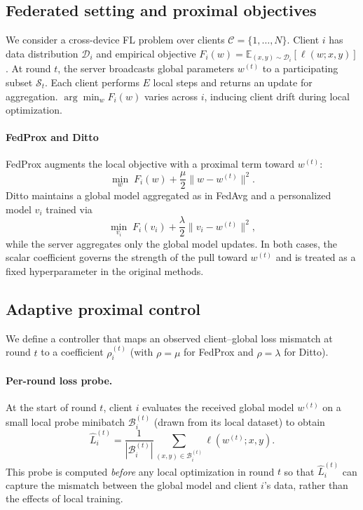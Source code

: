 \documentclass[letterpaper]{article} %
\begin{document}
\subsection{Federated setting and proximal objectives}

We consider a cross-device FL problem over clients $\mathcal{C}=\{1,\dots,N\}$. Client $i$ has data distribution $\mathcal{D}_i$ and empirical objective
$F_i(w)=\mathbb{E}_{(x,y)\sim\mathcal{D}_i}[\ell(w;x,y)]$.
At round $t$, the server broadcasts global parameters $w^{(t)}$ to a participating subset $\mathcal{S}_t$.
Each client performs $E$ local steps and returns an update for aggregation. $\arg\min_w F_i(w)$ varies across $i$, inducing client drift during local optimization.

\paragraph{FedProx and Ditto}
FedProx augments the local objective with a proximal term toward $w^{(t)}$:
\begin{equation}
\label{eq:fedprox_obj}
\min_{w}\; F_i(w) + \frac{\mu}{2}\|w-w^{(t)}\|^2.
\end{equation}
Ditto maintains a global model aggregated as in FedAvg and a personalized model $v_i$ trained via
\begin{equation}
\label{eq:ditto_obj}
\min_{v_i}\; F_i(v_i) + \frac{\lambda}{2}\|v_i-w^{(t)}\|^2,
\end{equation}
while the server aggregates only the global model updates. In both cases, the scalar coefficient governs the strength of the pull toward $w^{(t)}$ and is treated as a fixed hyperparameter in the original methods.

\subsection{Adaptive proximal control}

We define a controller that maps an observed client--global loss mismatch at round $t$ to a coefficient $\rho_i^{(t)}$ (with $\rho=\mu$ for FedProx and $\rho=\lambda$ for Ditto).

\paragraph{Per-round loss probe.}
At the start of round $t$, client $i$ evaluates the received global model $w^{(t)}$ on a small local probe minibatch $\mathcal{B}_i^{(t)}$ (drawn from its local dataset) to obtain
\begin{equation}
\label{eq:probe_loss}
\hat{L}_i^{(t)}=\frac{1}{|\mathcal{B}_i^{(t)}|}\sum_{(x,y)\in\mathcal{B}_i^{(t)}}\ell(w^{(t)};x,y).
\end{equation}
This probe is computed \emph{before} any local optimization in round $t$ so that $\hat{L}_i^{(t)}$ can capture the mismatch between the global model and client $i$'s data, rather than the effects of local training.
\end{document}
